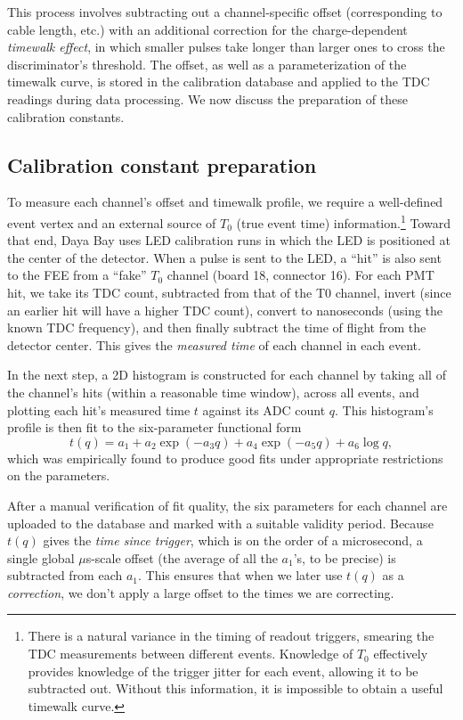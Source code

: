 \documentclass[../thesis.tex]{subfiles}
\begin{document}
This process involves subtracting out a channel-specific offset (corresponding to cable length, etc.) with an additional correction for the charge-dependent \emph{timewalk effect}, in which smaller pulses take longer than larger ones to cross the discriminator's threshold. The offset, as well as a parameterization of the timewalk curve, is stored in the calibration database and applied to the TDC readings during data processing. We now discuss the preparation of these calibration constants.

\subsection{Calibration constant preparation}

To measure each channel's offset and timewalk profile, we require a well-defined event vertex and an external source of $T_0$ (true event time) information.\footnote{There is a natural variance in the timing of readout triggers, smearing the TDC measurements between different events. Knowledge of $T_0$ effectively provides knowledge of the trigger jitter for each event, allowing it to be subtracted out. Without this information, it is impossible to obtain a useful timewalk curve.} Toward that end, Daya Bay uses LED calibration runs in which the LED is positioned at the center of the detector. When a pulse is sent to the LED, a ``hit'' is also sent to the FEE from a ``fake'' $T_0$ channel (board 18, connector 16). For each PMT hit, we take its TDC count, subtracted from that of the T0 channel, invert (since an earlier hit will have a higher TDC count), convert to nanoseconds (using the known TDC frequency), and then finally subtract the time of flight from the detector center. This gives the \emph{measured time} of each channel in each event.

In the next step, a 2D histogram is constructed for each channel by taking all of the channel's hits (within a reasonable time window), across all events, and plotting each hit's measured time $t$ against its ADC count $q$. This histogram's profile is then fit to the six-parameter functional form
\[ t(q) = a_1 + a_2 \exp (-a_3 q) + a_4 \exp (-a_5 q) + a_6 \log q, \] 
which was empirically found to produce good fits under appropriate restrictions on the parameters.

After a manual verification of fit quality, the six parameters for each channel are uploaded to the database and marked with a suitable validity period. Because $t(q)$ gives the \emph{time since trigger}, which is on the order of a microsecond, a single global $\mu$s-scale offset (the average of all the $a_1$'s, to be precise) is subtracted from each $a_1$. This ensures that when we later use $t(q)$ as a \emph{correction}, we don't apply a large offset to the times we are correcting.
\end{document}
